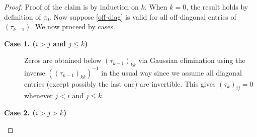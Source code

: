 \documentclass{article}
\theoremstyle{definition}
\numberwithin{equation}{section}
\begin{document}
\begin{proof}
Proof of the claim is by induction on $k$.  When $k=0$, the result holds by definition of $\tau_0$.  Now suppose \eqref{off-diag} is valid for all off-diagonal entries of $(\tau_{k-1})$.   
We now proceed by cases.

\begin{description}
\item [{\bf Case 1. ($i>j$ and $j\le k$)}]
Zeros are obtained below $(\tau_{k-1})_{kk}$ via Gaussian elimination using the inverse $((\tau_{k-1})_{kk})^{-1}$ in the usual way since we assume all diagonal entries (except possibly the last one) are invertible.  This gives $(\tau_k)_{ij}=0$ whenever $j<i$ and $j\le k$.
\end{description}

\begin{description}
\item [{\bf Case 2. ($i>j> k$)}]


\end{description}
\end{proof}
\end{document}
